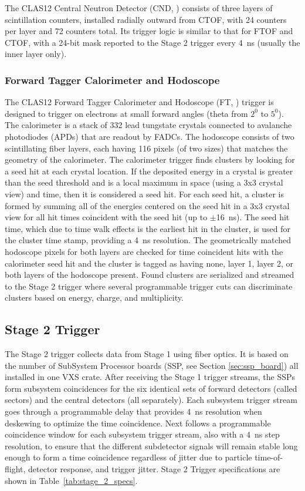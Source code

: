 The CLAS12 Central Neutron Detector (CND, \cite{cnd-ref}) consists of three layers of scintillation counters, installed radially outward from CTOF, with 24 counters per layer and 72 counters total. Its trigger logic is similar to that for FTOF and CTOF, with a 24-bit mask reported to the Stage 2 trigger every 4~ns (usually the inner layer only).


\subsubsection{Forward Tagger Calorimeter and Hodoscope}

The CLAS12 Forward Tagger Calorimeter and Hodoscope (FT, \cite{ft-ref}) trigger is designed to trigger on electrons at small forward angles (theta from $2^0$  to $5^0$). The calorimeter is a stack of 332 lead tungstate crystals connected to avalanche photodiodes (APDs) that are readout by FADCs. The hodoscope consists of two scintillating fiber layers, each having 116 pixels (of two sizes) that matches the geometry of the calorimeter. The calorimeter trigger finds clusters by looking for a seed hit at each crystal location. If the deposited energy in a crystal is greater than the seed threshold and is a local maximum in space (using a 3x3 crystal view) and time, then it is considered a seed hit. For each seed hit, a cluster is formed by summing all of the energies centered on the seed hit in a 3x3 crystal view for all hit times coincident with the seed hit (up to $\pm$16~ns). The seed hit time, which due to time walk effects is the earliest hit in the cluster, is used for the cluster time stamp, providing a 4~ns resolution. The geometrically matched hodoscope pixels for both layers are checked for time coincident hits with the calorimeter seed hit and the cluster is tagged as having none, layer 1, layer 2, or both layers of the hodoscope present. Found clusters are serialized and streamed to the Stage 2 trigger where several programmable trigger cuts can discriminate clusters based on energy, charge, and multiplicity.


\subsection{Stage 2 Trigger}

The Stage 2 trigger collects data from Stage 1 using fiber optics. It is based on the number of SubSystem Processor boards (SSP, see Section \ref*{sec:ssp_board}) all installed in one VXS crate. After receiving the Stage 1 trigger streams, the SSPs form subsystem coincidences for the six identical sets of forward detectors (called sectors) and the central detectors (all separately). Each subsystem trigger stream goes through a programmable delay that provides 4~ns resolution when deskewing to optimize the time coincidence. Next follows a programmable coincidence window for each subsystem trigger stream, also with a 4~ns step resolution, to ensure that the different subdetector signals will remain stable long enough to form a time coincidence regardless of jitter due to particle time-of-flight, detector response, and trigger jitter. Stage 2 Trigger specifications are shown in Table~\ref{tab:stage_2_specs}.

